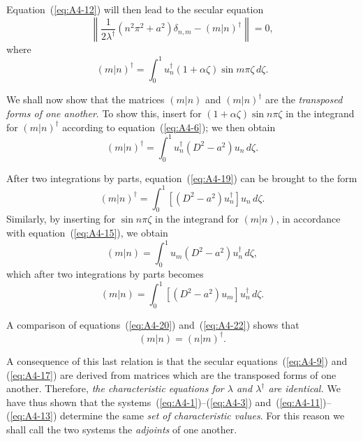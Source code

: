 Equation~(\ref{eq:A4-12}) will then lead to the secular equation
\begin{equation}
\label{eq:A4-17}
\left\| \frac{1}{2\lambda^\dagger}(n^2\pi^2 + a^2)\delta_{n,m} - (m|n)^\dagger \right\| = 0,
\end{equation}
where
\begin{equation}
\label{eq:A4-18}
(m|n)^\dagger = \int_0^1 u_n^\dagger (1 + \alpha\zeta)\sin m\pi\zeta \, d\zeta.
\end{equation}

We shall now show that the matrices $(m|n)$ and $(m|n)^\dagger$ are the \emph{transposed forms of one another}. To show this, insert for $(1+\alpha\zeta)\sin n\pi\zeta$ in
the integrand for $(m|n)^\dagger$ according to equation~(\ref{eq:A4-6}); we then obtain
\begin{equation}
\label{eq:A4-19}
(m|n)^\dagger = \int_0^1 u_n^\dagger (D^2 - a^2)u_n \, d\zeta.
\end{equation}

After two integrations by parts, equation~(\ref{eq:A4-19}) can be brought to the form
\begin{equation}
\label{eq:A4-20}
(m|n)^\dagger = \int_0^1 [(D^2 - a^2)u_n^\dagger] u_n \, d\zeta.
\end{equation}
Similarly, by inserting for $\sin n\pi\zeta$ in the integrand for $(m|n)$, in
accordance with equation~(\ref{eq:A4-15}), we obtain
\begin{equation}
\label{eq:A4-21}
(m|n) = \int_0^1 u_m (D^2 - a^2)u_n^\dagger \, d\zeta,
\end{equation}
which after two integrations by parts becomes
\begin{equation}
\label{eq:A4-22}
(m|n) = \int_0^1 [(D^2 - a^2)u_m] u_n^\dagger \, d\zeta.
\end{equation}

A comparison of equations~(\ref{eq:A4-20}) and~(\ref{eq:A4-22}) shows that
\begin{equation}
\label{eq:A4-23}
(m|n) = (n|m)^\dagger.
\end{equation}

A consequence of this last relation is that the secular equations~(\ref{eq:A4-9}) and
(\ref{eq:A4-17}) are derived from matrices which are the transposed forms of one
another. Therefore, \emph{the characteristic equations for $\lambda$ and $\lambda^\dagger$ are identical.}
We have thus shown that the systems~(\ref{eq:A4-1})--(\ref{eq:A4-3}) and~(\ref{eq:A4-11})--(\ref{eq:A4-13}) determine the
same \emph{set of characteristic values}. For this reason we shall call the two
systems the \emph{adjoints} of one another.


